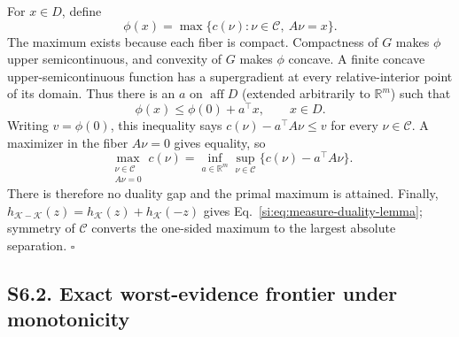 \documentclass[10pt,twocolumn]{article}
\begin{document}
For $x\in D$, define
\begin{equation*}
\phi(x)=\max\{c(\nu):\nu\in\mathcal C,\ A\nu=x\}.
\end{equation*}
The maximum exists because each fiber is compact. Compactness of $G$ makes
$\phi$ upper semicontinuous, and convexity of $G$ makes $\phi$ concave. A
finite concave upper-semicontinuous function has a supergradient at every
relative-interior point of its domain. Thus there is an $a$ on
$\operatorname{aff}D$ (extended arbitrarily to $\mathbb R^m$) such that
\begin{equation*}
\phi(x)\le\phi(0)+a^\top x,\qquad x\in D.
\end{equation*}
Writing $v=\phi(0)$, this inequality says
$c(\nu)-a^\top A\nu\le v$ for every $\nu\in\mathcal C$. A maximizer in the
fiber $A\nu=0$ gives equality, so
\begin{equation}
\max_{\substack{\nu\in\mathcal C\\A\nu=0}}c(\nu)
=\inf_{a\in\mathbb R^m}\sup_{\nu\in\mathcal C}
\{c(\nu)-a^\top A\nu\}.
\label{si:eq:equality-lagrange}
\end{equation}
There is therefore no duality gap and the primal maximum is attained. Finally,
$h_{\mathcal K-\mathcal K}(z)=h_{\mathcal K}(z)+h_{\mathcal K}(-z)$ gives
Eq.~\ref{si:eq:measure-duality-lemma}; symmetry of $\mathcal C$ converts the
one-sided maximum to the largest absolute separation. \hfill$\square$

\subsection*{S6.2. Exact worst-evidence frontier under monotonicity}
\end{document}

